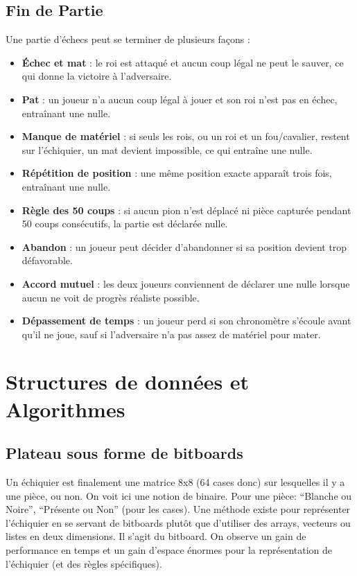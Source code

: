 \documentclass{article}
\begin{document}
\subsection{Fin de Partie}
Une partie d'échecs peut se terminer de plusieurs façons :
\begin{itemize}
    \item \textbf{Échec et mat} : le roi est attaqué et aucun coup légal ne peut le sauver, ce qui donne la victoire à l'adversaire.
    \item \textbf{Pat} : un joueur n'a aucun coup légal à jouer et son roi n'est pas en échec, entraînant une nulle.
    \item \textbf{Manque de matériel} : si seuls les rois, ou un roi et un fou/cavalier, restent sur l'échiquier, un mat devient impossible, ce qui entraîne une nulle.
    \item \textbf{Répétition de position} : une même position exacte apparaît trois fois, entraînant une nulle.
    \item \textbf{Règle des 50 coups} : si aucun pion n'est déplacé ni pièce capturée pendant 50 coups consécutifs, la partie est déclarée nulle.
    \item \textbf{Abandon} : un joueur peut décider d'abandonner si sa position devient trop défavorable.
    \item \textbf{Accord mutuel} : les deux joueurs conviennent de déclarer une nulle lorsque aucun ne voit de progrès réaliste possible.
    \item \textbf{Dépassement de temps} : un joueur perd si son chronomètre s'écoule avant qu'il ne joue, sauf si l'adversaire n'a pas assez de matériel pour mater.
\end{itemize}


\section{Structures de données et Algorithmes}
\label{DataStruct}

\subsection{Plateau sous forme de bitboards}
Un échiquier est finalement une matrice 8x8 (64 cases donc) sur lesquelles il y a une pièce, ou non. On voit ici une
notion de binaire. Pour une pièce: ``Blanche ou Noire'', ``Présente ou Non'' (pour les cases). Une méthode existe pour
représenter l'échiquier en se servant de bitboards plutôt que d'utiliser des arrays, vecteurs ou listes en deux dimensions.
Il s'agit du bitboard. On observe un gain de performance en temps et un gain d'espace énormes pour la représentation
de l'échiquier (et des règles spécifiques).
\end{document}
